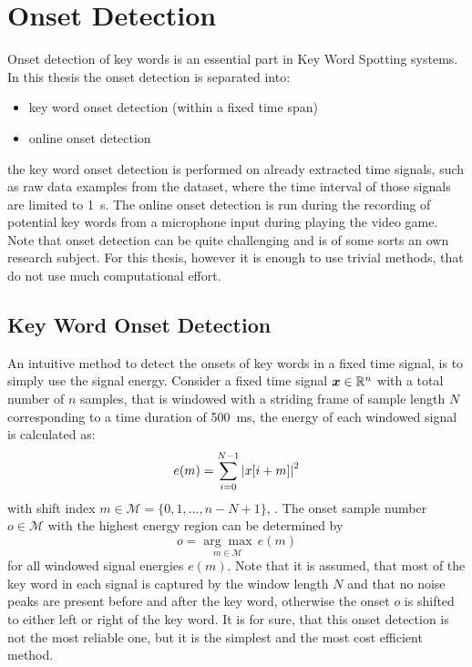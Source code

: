 
\section{Onset Detection}\label{sec:signal_onset}
\thesisStateReady
\thesisStateNew
Onset detection of key words is an essential part in Key Word Spotting systems.
In this thesis the onset detection is separated into:
\begin{itemize}
  \item key word onset detection (within a fixed time span)
  \item online onset detection
\end{itemize}
the key word onset detection is performed on already extracted time signals, such as raw data examples from the dataset, where the time interval of those signals are limited to \SI{1}{\second}.
The online onset detection is run during the recording of potential key words from a microphone input during playing the video game.
Note that onset detection can be quite challenging and is of some sorts an own research subject.
For this thesis, however it is enough to use trivial methods, that do not use much computational effort.



\subsection{Key Word Onset Detection}
An intuitive method to detect the onsets of key words in a fixed time signal, is to simply use the signal energy.
Consider a fixed time signal $\bm{x} \in \mathbb{R}^n$ with a total number of $n$ samples, that is windowed with a striding frame of sample length $N$ corresponding to a time duration of \SI{500}{\milli\second}, the energy of each windowed signal is calculated as:
\begin{equation}\label{eq:e_win}
  e(m) = \sum_{i=0}^{N-1} \abs{x[i + m]}^2
\end{equation}
with shift index $m \in \mathcal{M} = \{0, 1, \dots, n - N + 1\}$, .
The onset sample number $o \in \mathcal{M}$ with the highest energy region can be determined by
\begin{equation}\label{eq:onset}
  o = \underset{m \in \mathcal{M}}{\arg \max} \, e(m)
\end{equation}
for all windowed signal energies $e(m)$.
Note that it is assumed, that most of the key word in each signal is captured by the window length $N$ and that no noise peaks are present before and after the key word, otherwise the onset $o$ is shifted to either left or right of the key word.
It is for sure, that this onset detection is not the most reliable one, but it is the simplest and the most cost efficient method.


